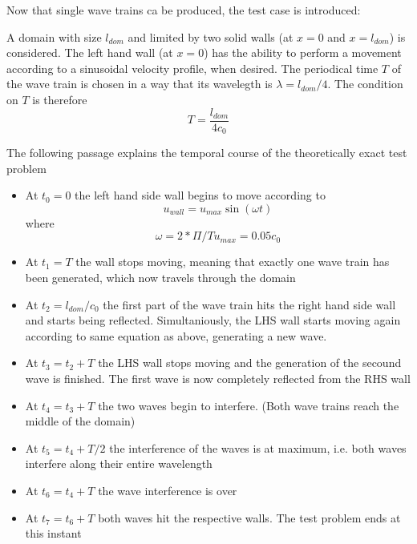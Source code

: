 \documentclass{report}
\begin{document}
Now that single wave trains ca be produced, the test case is introduced:

A domain with size $l_{\mathit{dom}}$ and limited by two solid walls (at $x=0$ and $x=l_{\mathit{dom}}$) is considered. The left hand wall (at $x=0$) has the ability to perform a movement according to a sinusoidal velocity profile, when desired.
The periodical time $T$ of the wave train is chosen in a way that its wavelegth is
$\lambda=l_{\mathit{dom}}/4$. The condition on $T$ is therefore
\begin{equation}
 T=\frac{l_{\mathit{dom}}}{4 c_0}
\end{equation}

The following passage explains the temporal course of the theoretically exact test problem

\begin{itemize} 
\item At $t_0=0$ the left hand side wall begins to move according to 
\begin{equation}
  u_{\mathit{wall}}=u_{\mathit{max}}\sin(\omega t) 
\end{equation}
  where 
\begin{equation}
\omega=2*\Pi/T u_{\mathit{max}}=0.05 c_0
\end{equation}


\item At $t_1=T$ the wall stops moving, meaning that exactly one wave train has been generated, which now travels through the domain

\item At $t_2=l_{\mathit{dom}}/c_0$ the first part of the wave train hits the right hand side  wall and starts being reflected. Simultaniously, the LHS wall starts moving again according to same equation as above, generating a new wave.

\item At $t_3=t_2+T$ the LHS wall stops moving and the generation of the secound wave is finished. 
The first wave is now completely reflected from the RHS wall

\item At $t_4=t_3+T$ the two waves begin to interfere. (Both wave trains reach the middle of the domain)

\item At $t_5=t_4+T/2$ the interference of the waves is at maximum, i.e. both waves interfere along their entire wavelength

\item At $t_6=t_4+T$ the wave interference is over

\item At $t_7=t_6+T$ both waves hit the respective walls. The test problem ends at this instant
\end{itemize}
\end{document}
